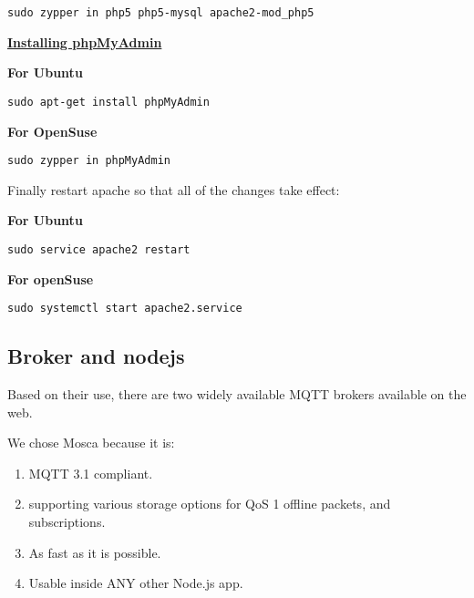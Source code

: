 \documentclass[16pt]{article}
\begin{document}
  \texttt{sudo zypper in php5 php5-mysql apache2-mod\_php5}
  
   \vspace{0.5cm}

  {\underline{\textbf{Installing phpMyAdmin}}}

  \textbf{For Ubuntu}

  \texttt{sudo apt-get install phpMyAdmin}

  \textbf{For OpenSuse}

  \texttt{sudo zypper in phpMyAdmin}
   \vspace{0.5cm}

  Finally restart apache so that all of the changes take effect:

  \textbf{For Ubuntu}

  \texttt{sudo service apache2 restart}

  \textbf{For openSuse}

  \texttt{sudo systemctl start apache2.service}
   \vspace{0.5cm}

 

  

\subsection{Broker and nodejs}

 \vspace{0.5cm}

Based on their use, there are two widely available MQTT brokers
available on the web. 

We chose Mosca because it is: 

\begin{enumerate}

\item MQTT 3.1 compliant.
\item supporting various storage options for QoS 1 offline packets, and subscriptions.
\item As fast as it is possible.
\item Usable inside ANY other Node.js app.

\end{enumerate}
 \vspace{0.5cm}


\end{document}
